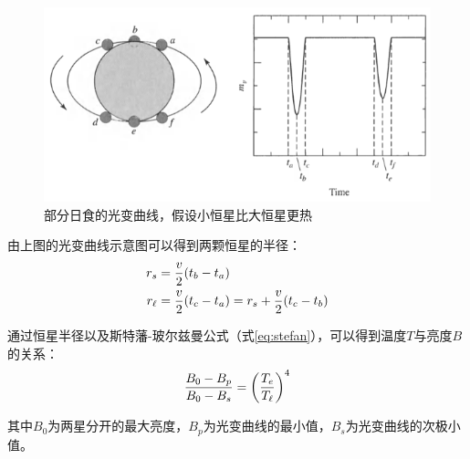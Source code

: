\begin{figure}[hbt]
  \centering
  \includegraphics[width=12cm]{chapters/07/eclipse3}
  \caption{部分日食的光变曲线，假设小恒星比大恒星更热}
  \label{}
\end{figure}

由上图的光变曲线示意图可以得到两颗恒星的半径：
\begin{align}
  r_s&={v\over 2}(t_b-t_a)\\
  r_\ell &={v\over 2}(t_c-t_a)=r_s+{v\over 2}(t_c-t_b)
\end{align}

通过恒星半径以及斯特藩-玻尔兹曼公式（式\ref{eq:stefan}），可以得到温度$T$与亮度$B$的关系：
\begin{equation}
  {B_0-B_p\over B_0-B_s}=\left({T_e\over T_\ell}\right)^4
\end{equation}

其中$B_0$为两星分开的最大亮度，$B_p$为光变曲线的最小值，$B_s$为光变曲线的次极小值。

